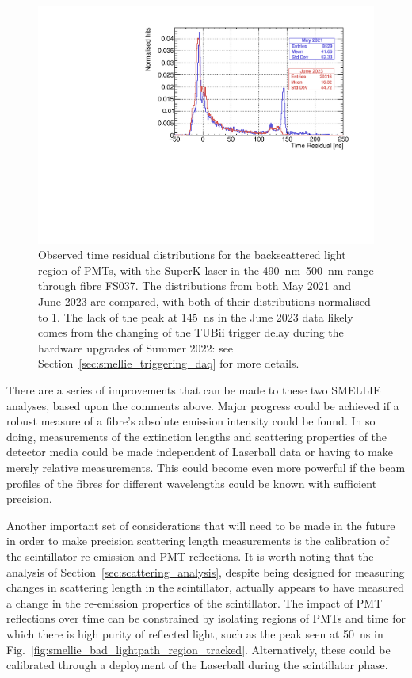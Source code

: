 \begin{figure}[!th]
    \centering
    \includegraphics[width=\textwidth]{5_SMELLIEAnalysis/images/FS037_superK_490_500_May2021_vs_Jun2023_back_tres.pdf}
    \caption[Observed time residual distributions for the backscattered light region for FS037, comparing May 2021 to June 2023 data]
    {Observed time residual distributions for the backscattered light region of PMTs, with the SuperK laser in the \SIrange{490}{500}{\nm} range through fibre FS037. The distributions from both May 2021 and June 2023 are compared, with both of their distributions normalised to 1. The lack of the peak at \SI{145}{\nano\second} in the June 2023 data likely comes from the changing of the TUBii trigger delay during the hardware upgrades of Summer 2022: see Section~\ref{sec:smellie_triggering_daq} for more details.} 
    \label{fig:smellie_FS037_backscat_tres_comparison}
\end{figure}

There are a series of improvements that can be made to these two SMELLIE analyses, based upon the comments above. Major progress could be achieved if a robust measure of a fibre's absolute emission intensity could be found. In so doing, measurements of the extinction lengths and scattering properties of the detector media could be made independent of Laserball data or having to make merely relative measurements. This could become even more powerful if the beam profiles of the fibres for different wavelengths could be known with sufficient precision.

Another important set of considerations that will need to be made in the future in order to make precision scattering length measurements is the calibration of the scintillator re-emission and PMT reflections. It is worth noting that the analysis of Section~\ref{sec:scattering_analysis}, despite being designed for measuring changes in scattering length in the scintillator, actually appears to have measured a change in the re-emission properties of the scintillator. The impact of PMT reflections over time can be constrained by isolating regions of PMTs and time for which there is high purity of reflected light, such as the peak seen at \SI{50}{\ns} in Fig.~\ref{fig:smellie_bad_lightpath_region_tracked}. Alternatively, these could be calibrated through a deployment of the Laserball during the scintillator phase.

